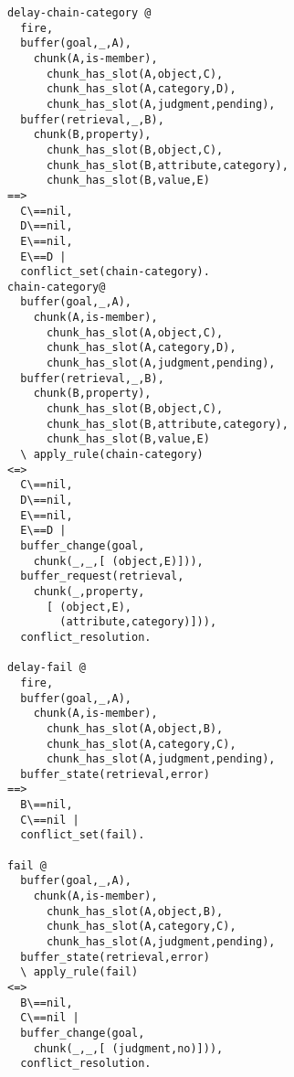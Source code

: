 \begin{lstlisting}[caption={Translated production rules for the semantic model in CHR}]
delay-chain-category @ 
  fire,
  buffer(goal,_,A),
    chunk(A,is-member),
      chunk_has_slot(A,object,C),
      chunk_has_slot(A,category,D),
      chunk_has_slot(A,judgment,pending),
  buffer(retrieval,_,B),
    chunk(B,property),
      chunk_has_slot(B,object,C),
      chunk_has_slot(B,attribute,category),
      chunk_has_slot(B,value,E)
==>
  C\==nil,
  D\==nil,
  E\==nil,
  E\==D |
  conflict_set(chain-category).
chain-category@
  buffer(goal,_,A),
    chunk(A,is-member),
      chunk_has_slot(A,object,C),
      chunk_has_slot(A,category,D),
      chunk_has_slot(A,judgment,pending),
  buffer(retrieval,_,B),
    chunk(B,property),
      chunk_has_slot(B,object,C),
      chunk_has_slot(B,attribute,category),
      chunk_has_slot(B,value,E)
  \ apply_rule(chain-category)
<=>
  C\==nil,
  D\==nil,
  E\==nil,
  E\==D |
  buffer_change(goal,
    chunk(_,_,[ (object,E)])),
  buffer_request(retrieval,
    chunk(_,property,
      [ (object,E), 
        (attribute,category)])),
  conflict_resolution.

delay-fail @
  fire,
  buffer(goal,_,A),
    chunk(A,is-member),
      chunk_has_slot(A,object,B),
      chunk_has_slot(A,category,C),
      chunk_has_slot(A,judgment,pending),
  buffer_state(retrieval,error)
==>
  B\==nil,
  C\==nil |
  conflict_set(fail).
  
fail @
  buffer(goal,_,A),
    chunk(A,is-member),
      chunk_has_slot(A,object,B),
      chunk_has_slot(A,category,C),
      chunk_has_slot(A,judgment,pending),
  buffer_state(retrieval,error)
  \ apply_rule(fail)
<=>
  B\==nil,
  C\==nil |
  buffer_change(goal,
    chunk(_,_,[ (judgment,no)])),
  conflict_resolution.
  

\end{lstlisting}
